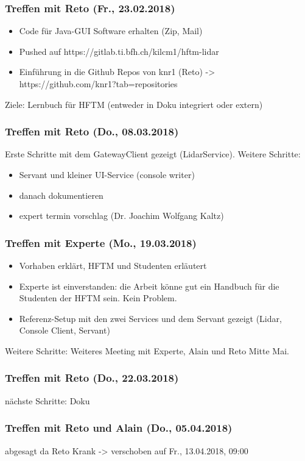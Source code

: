 \subsubsection{Treffen mit Reto (Fr., 23.02.2018)}
\begin{itemize}
	\item Code für Java-GUI Software erhalten (Zip, Mail)
	\item Pushed auf https://gitlab.ti.bfh.ch/kilcm1/hftm-lidar
	\item Einführung in die Github Repos von knr1 (Reto) -> https://github.com/knr1?tab=repositories
\end{itemize}
Ziele: Lernbuch für HFTM (entweder in Doku integriert oder extern)


\subsubsection{Treffen mit Reto (Do., 08.03.2018)}
Erste Schritte mit dem GatewayClient gezeigt (LidarService). Weitere Schritte:
\begin{itemize}
	\item Servant und kleiner UI-Service (console writer)
	\item danach dokumentieren
	\item expert termin vorschlag (Dr. Joachim Wolfgang Kaltz)
\end{itemize}
\subsubsection{Treffen mit Experte (Mo., 19.03.2018)}
\begin{itemize}
	\item Vorhaben erklärt, HFTM und Studenten erläutert
	\item Experte ist einverstanden: die Arbeit könne gut ein Handbuch für die Studenten der HFTM sein. Kein Problem.
	\item Referenz-Setup mit den zwei Services und dem Servant gezeigt (Lidar, Console Client, Servant)
\end{itemize}
Weitere Schritte: Weiteres Meeting mit Experte, Alain und Reto Mitte Mai.
\subsubsection{Treffen mit Reto (Do., 22.03.2018)}
nächste Schritte: Doku
\subsubsection{Treffen mit Reto und Alain (Do., 05.04.2018)}
abgesagt da Reto Krank -> verschoben auf Fr., 13.04.2018, 09:00
